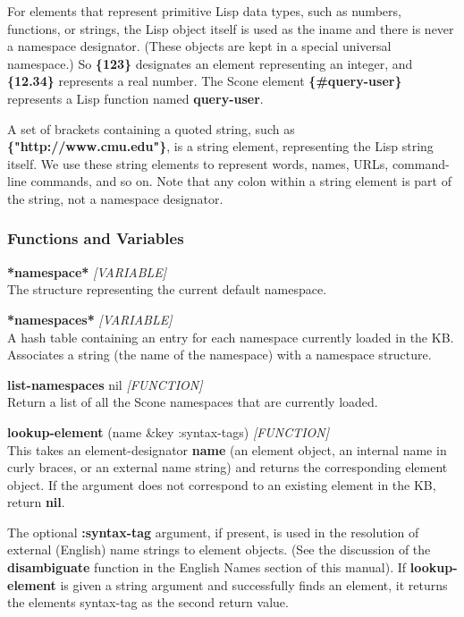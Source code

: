 \documentclass[titlepage,twoside,openright,11pt]{article}
\begin{document}
For elements that represent primitive Lisp data types, such as numbers,
functions, or strings, the Lisp object itself is used as the iname and
there is never a namespace designator. (These objects are kept in a
special universal namespace.) So \textbf{\{123\}} designates an element
representing an integer, and \textbf{\{12.34\}} represents a real
number. The Scone element \textbf{\{\#\textquotesingle query-user\}}
represents a Lisp function named \textbf{query-user}.

A set of brackets containing a quoted string, such as
\textbf{\{"http://www.cmu.edu"\}}, is a string element, representing the
Lisp string itself. We use these string elements to represent words,
names, URLs, command-line commands, and so on. Note that any colon
within a string element is part of the string, not a namespace
designator.

\subsubsection{Functions and Variables}\label{functions-and-variables-2}

\textbf{*namespace*} \emph{{[}VARIABLE{]}}\\
The structure representing the current default namespace.

\textbf{*namespaces*} \emph{{[}VARIABLE{]}}\\
A hash table containing an entry for each namespace currently loaded in
the KB. Associates a string (the name of the namespace) with a namespace
structure.

\textbf{list-namespaces} nil \emph{{[}FUNCTION{]}}\\
Return a list of all the Scone namespaces that are currently loaded.

\textbf{lookup-element} (name \&key :syntax-tags) \emph{{[}FUNCTION{]}\\
}This takes an element-designator \textbf{name} (an element object, an
internal name in curly braces, or an external name string) and returns
the corresponding element object. If the argument does not correspond to
an existing element in the KB, return \textbf{nil}.

The optional \textbf{:syntax-tag} argument, if present, is used in the
resolution of external (English) name strings to element objects. (See
the discussion of the \textbf{disambiguate} function in the English
Names section of this manual). If \textbf{lookup-element} is given a
string argument and successfully finds an element, it returns the
element\textquotesingle s syntax-tag as the second return value.
\end{document}
